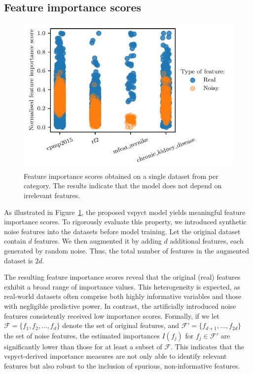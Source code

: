 \documentclass[3p,review,authoryear]{elsarticle}
\begin{document}
\subsection{Feature importance scores}

\begin{figure}[h!]
    \centering
    \includegraphics{../figures/feat_importances.pdf}
    \caption{Feature importance scores obtained on a single dataset from per category. The results indicate that the model does not depend on irrelevant features.}
    \label{fig:feature_importances}
\end{figure}

As illustrated in Figure~\ref{fig:feature_importances}, the proposed \gls{vspyct} model yields meaningful feature importance scores.
To rigorously evaluate this property, we introduced synthetic noise features into the datasets before model training.
Let the original dataset contain \(d\) features.
We then augmented it by adding \(d\) additional features, each generated by random noise.
Thus, the total number of features in the augmented dataset is \(2d\).

The resulting feature importance scores reveal that the original (real) features exhibit a broad range of importance values.
This heterogeneity is expected, as real-world datasets often comprise both highly informative variables and those with negligible predictive power.
In contrast, the artificially introduced noise features consistently received low importance scores.
Formally, if we let \(\mathcal{F} = \{f_1, f_2, \ldots, f_d\}\) denote the set of original features, and \(\mathcal{F}' = \{f_{d+1}, \ldots, f_{2d}\}\) the set of noise features, the estimated importances \(I(f_j)\) for \(f_j \in \mathcal{F}'\) are significantly lower than those for at least a subset of \(\mathcal{F}\).
This indicates that the \gls{vspyct}-derived importance measures are not only able to identify relevant features but also robust to the inclusion of spurious, non-informative features.
\end{document}
